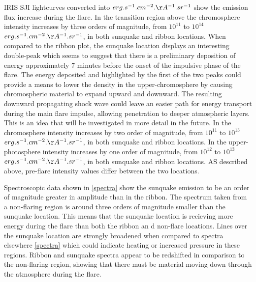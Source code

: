 IRIS SJI lightcurves converted into $erg.s^{-1}.cm^{-2}.\AA^{-1}.sr^{-1}$ show the emission flux increase during the flare. In the transition region above the chromosphere intensity increases by three orders of magnitude, from $10^11$ to $10^14$ $erg.s^{-1}.cm^{-2}.\AA^{-1}.sr^{-1}$, in both sunquake and ribbon locations. When compared to the ribbon plot, the sunquake location displays an interesting double-peak which seems to suggest that there is a preliminary deposition of energy approximately 7 minutes before the onset of the impulsive phase of the flare. The energy deposited and highlighted by the first of the two peaks could provide a means to lower the density in the upper-chromosphere by causing chromospheric material to expand upward and downward. The resulting downward propagating shock wave could leave an easier path for energy transport during the main flare impulse, allowing penetration to deeper atmospheric layers. This is an idea that will be investigated in more detail in the future. In the chromosphere intensity increases by two order of magnitude, from $10^11$ to $10^13$ $erg.s^{-1}.cm^{-2}.\AA^{-1}.sr^{-1}$, in both sunquake and ribbon locations. In the upper-photosphere intensity increases by one order of magnitude, from $10^12$ to $10^13$ $erg.s^{-1}.cm^{-2}.\AA^{-1}.sr^{-1}$, in both sunquake and ribbon locations. AS described above, pre-flare intensity values differ between the two locations.

Spectroscopic data shown in \ref{spectra} show the sunquake emission to be an order of magnitude greater in amplitude than in the ribbon. The spectrum taken from a non-flaring region is around three orders of magnitude smaller than the sunquake location. This means that the sunquake location is recieving more energy during the flare than both the ribbon an d non-flare locations. Lines over the sunquake location are strongly broadened when compared to spectra elsewhere \ref{spectra} which could indicate heating or increased pressure in these regions. Ribbon and sunquake spectra appear to be redshifted in comparison to the non-flaring region, showing that there must be material moving down through the atmosphere during the flare.\\


